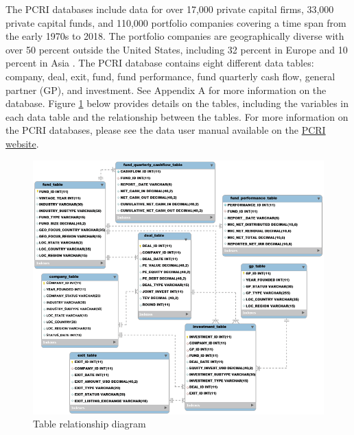 \documentclass[
]{WileySix}
\begin{document}
The PCRI databases include data for over 17,000 private capital firms, 33,000 private capital funds, and 110,000 portfolio companies covering a time span from the early 1970s to 2018. The portfolio companies are geographically diverse with over 50 percent outside the United States, including 32 percent in Europe and 10 percent in Asia \citep{jeng2015}. The PCRI database contains eight different data tables: company, deal, exit, fund, fund performance, fund quarterly cash flow, general partner (GP), and investment. See Appendix A for more information on the database. Figure \ref{fig:pcrifigure2} below provides details on the tables, including the variables in each data table and the relationship between the tables. For more information on the PCRI databases, please see the data user manual available on the \href{http://privatecapitalresearchinstitute.org/images/news/pcri_manual_2_4.pdf}{PCRI website}.

\begin{figure}
\includegraphics[width=1\linewidth]{./assets/pcri/pcrifigure2web} \caption{Table relationship diagram}\label{fig:pcrifigure2}
\end{figure}
\end{document}
